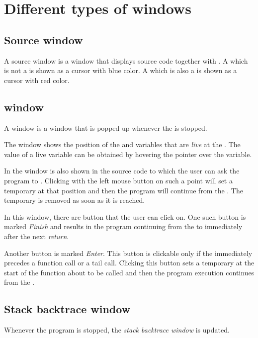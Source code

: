 \chapter{Different types of windows}

\section{Source window}

A source window is a window that displays source code together with
\pollpoints{}.  A \pollpoint{} which is not a \breakpoint{} is shown
as a cursor with blue color.  A \pollpoint{} which is also a
\breakpoint{} is shown as a cursor with red color.

\section{\Stoppingpoint{} window}

A \stoppingpoint{} window is a window that is popped up whenever 
the \applicationthread{} is stopped.

The \stoppingpoint{} window shows the position of the \stoppingpoint{}
and variables that are \emph{live} at the \stoppingpoint{}.  The value
of a live variable can be obtained by hovering the pointer over the
variable.

In the \stoppingpoint{} window is also shown \pollpoints{} in the
source code to which the user can ask the program to \emph{\dvance{}}.
Clicking with the left mouse button on such a point will set a
temporary \stoppingpoint{} at that position and then the program will
continue from the \stoppingpoint{}.  The temporary \stoppingpoint{} is
removed as soon as it is reached.

In this window, there are button that the user can click on.  One such
button is marked \emph{Finish} and results in the program continuing
from the \stoppingpoint{} to immediately after the next \emph{return}.

Another button is marked \emph{Enter}.  This button is clickable only
if the \stoppingpoint{} immediately precedes a function call or a tail
call.  Clicking this button sets a temporary \stoppingpoint{} at the
start of the function about to be called and then the program
execution continues from the \stoppingpoint{}.

\section{Stack backtrace window}

Whenever the program is stopped, the \emph{stack backtrace window} is
updated.
